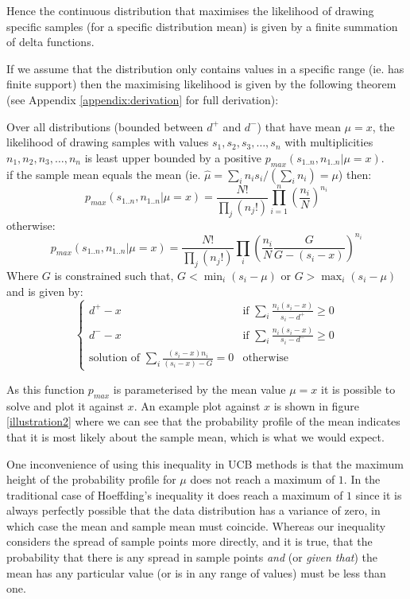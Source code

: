 \documentclass[12pt]{colt2020} %
\begin{document}
Hence the continuous distribution that maximises the likelihood of drawing specific samples (for a specific distribution mean) is given by a finite summation of delta functions.

If we assume that the distribution only contains values in a specific range (ie. has finite support) then the maximising likelihood is given by the following theorem (see Appendix \ref{appendix:derivation} for full derivation):



\begin{theorem}\label{main_theorem}
Over all distributions (bounded between $d^+$ and $d^-$) that have mean $\mu=x$, the likelihood of drawing samples with values $s_1,s_2,s_3,\dots,s_n$ with multiplicities $n_1,n_2,n_3,\dots,n_n$ is least upper bounded by a positive $p_{max}(s_{1..n},n_{1..n}|\mu=x)$.\\
if the sample mean equals the mean (ie. $\hat{\mu} =\sum_in_is_i/(\sum_in_i)=\mu$) then: 
\begin{equation}\label{main_theorem1}p_{max}(s_{1..n},n_{1..n}|\mu=x) = \frac{N!}{\prod_j(n_j!)}\prod_{i=1}^n \left(\frac{n_i}{N}\right)^{n_i}\end{equation}
otherwise:
\begin{equation}\label{main_theorem2}p_{max}(s_{1..n},n_{1..n}|\mu=x) = \frac{N!}{\prod_j(n_j!)}\prod_i \left(\frac{n_i}{N}\frac{G}{G-(s_i-x)}\right)^{n_i}\end{equation}
Where $G$ is constrained such that, $G<\min_i (s_i-\mu)$ or $G>\max_i (s_i-\mu)$\\ and is given by:
$$\left\{
	\begin{array}{ll}
		d^+-x &\mbox{if } \sum_i\frac{n_i(s_i-x)}{s_i-d^+} \ge 0 \\
		d^--x &\mbox{if } \sum_i\frac{n_i(s_i-x)}{s_i-d^-} \ge 0\\
		\mbox{solution of } \sum_i \frac{(s_i-x)n_i}{(s_i-x)-G} =0 &\mbox{otherwise}
	\end{array}
\right.$$
\end{theorem}

As this function $p_{max}$ is parameterised by the mean value $\mu=x$ it is possible to solve and plot it against $x$.
An example plot against $x$ is shown in figure \ref{illustration2} where we can see that the probability profile of the mean indicates that it is most likely about the sample mean, which is what we would expect.

One inconvenience of using this inequality in UCB methods is that the maximum height of the probability profile for $\mu$ does not reach a maximum of $1$.
In the traditional case of Hoeffding's inequality it does reach a maximum of $1$ since it is always perfectly possible that the data distribution has a variance of zero, in which case the mean and sample mean must coincide.
Whereas our inequality considers the spread of sample points more directly, and it is true, that the probability that there is any spread in sample points \textit{and} (or \textit{given that}) the mean has any particular value (or is in any range of values) must be less than one.
\end{document}
